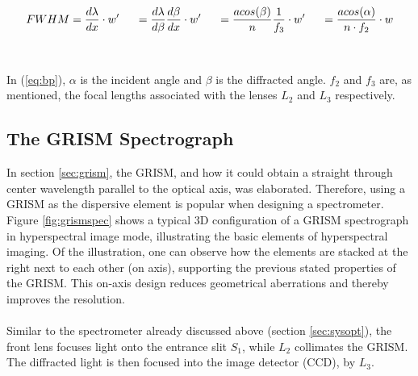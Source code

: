\begin{equation}
    FWHM = \frac{d\lambda}{dx} \cdot w'\hspace{0.5cm}
    = \frac{d\lambda}{d\beta} \frac{d\beta}{dx}\cdot w' \hspace{0.5cm}
    = \frac{a cos(\beta)}{n} \frac{1}{f_3}\cdot w' \hspace{0.5cm}
    = \frac{a cos(\alpha)}{n\cdot f_2}\cdot w
    \label{eq:bp}
\end{equation}
\\\\
\noindent
In (\ref{eq:bp}), $\alpha$ is the incident angle and $\beta$ is the diffracted angle. $f_2$ and $f_3$ are, as mentioned, the focal lengths associated with the lenses $L_2$ and $L_3$ respectively.


\subsection{The GRISM Spectrograph}
In section \ref{sec:grism}, the GRISM, and how it could obtain a straight through center wavelength parallel to the optical axis, was elaborated. Therefore, using a GRISM as the dispersive element is popular when designing a spectrometer. Figure \ref{fig:grismspec} shows a typical 3D configuration of a GRISM spectrograph in hyperspectral image mode, illustrating the basic elements of hyperspectral imaging. Of the illustration, one can observe how the elements are stacked at the right next to each other (on axis), supporting the previous stated properties of the GRISM. This on-axis design reduces geometrical aberrations and thereby improves the resolution. 
\\\\
Similar to the spectrometer already discussed above (section \ref{sec:sysopt}), the front lens focuses light onto the entrance slit $S_1$, while $L_2$ collimates the GRISM. The diffracted light is then focused into the image detector (CCD), by $L_3$. 

